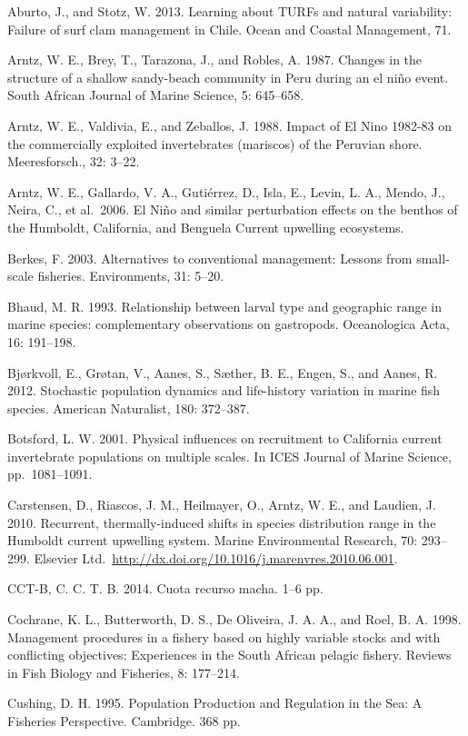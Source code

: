 \documentclass[12pt]{article}
\begin{document}
Aburto, J., and Stotz, W. 2013. Learning about TURFs and natural
variability: Failure of surf clam management in Chile. Ocean and Coastal
Management, 71.

Arntz, W. E., Brey, T., Tarazona, J., and Robles, A. 1987. Changes in
the structure of a shallow sandy-beach community in Peru during an el
niño event. South African Journal of Marine Science, 5: 645--658.

Arntz, W. E., Valdivia, E., and Zeballos, J. 1988. Impact of El Nino
1982-83 on the commercially exploited invertebrates (mariscos) of the
Peruvian shore. Meeresforsch., 32: 3--22.

Arntz, W. E., Gallardo, V. A., Gutiérrez, D., Isla, E., Levin, L. A.,
Mendo, J., Neira, C., et al.~2006. El Niño and similar perturbation
effects on the benthos of the Humboldt, California, and Benguela Current
upwelling ecosystems.

Berkes, F. 2003. Alternatives to conventional management: Lessons from
small-scale fisheries. Environments, 31: 5--20.

Bhaud, M. R. 1993. Relationship between larval type and geographic range
in marine species: complementary observations on gastropods.
Oceanologica Acta, 16: 191--198.

Bjørkvoll, E., Grøtan, V., Aanes, S., Sæther, B. E., Engen, S., and
Aanes, R. 2012. Stochastic population dynamics and life-history
variation in marine fish species. American Naturalist, 180: 372--387.

Botsford, L. W. 2001. Physical influences on recruitment to California
current invertebrate populations on multiple scales. In ICES Journal of
Marine Science, pp.~1081--1091.

Carstensen, D., Riascos, J. M., Heilmayer, O., Arntz, W. E., and
Laudien, J. 2010. Recurrent, thermally-induced shifts in species
distribution range in the Humboldt current upwelling system. Marine
Environmental Research, 70: 293--299. Elsevier
Ltd.~\url{http://dx.doi.org/10.1016/j.marenvres.2010.06.001}.

CCT-B, C. C. T. B. 2014. Cuota recurso macha. 1--6 pp.

Cochrane, K. L., Butterworth, D. S., De Oliveira, J. A. A., and Roel, B.
A. 1998. Management procedures in a fishery based on highly variable
stocks and with conflicting objectives: Experiences in the South African
pelagic fishery. Reviews in Fish Biology and Fisheries, 8: 177--214.

Cushing, D. H. 1995. Population Production and Regulation in the Sea: A
Fisheries Perspective. Cambridge. 368 pp.
\end{document}
